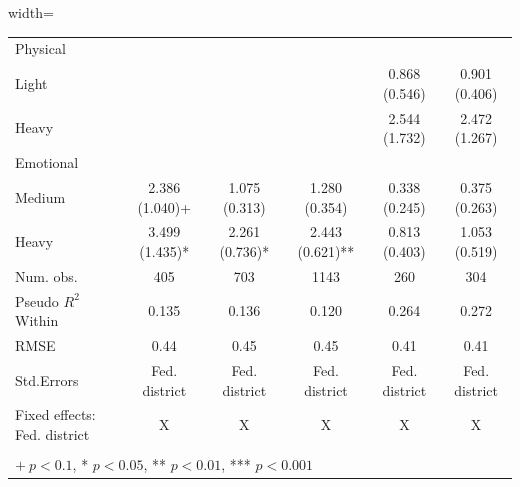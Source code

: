 \begin{adjustbox}{width=\textwidth}
\begin{tabular}{lccccc}
		Physical & & & & & \\
		\hspace{3mm}Light &  &  &  & \num{0.868} (\num{0.546}) & \num{0.901} (\num{0.406})\\
		\hspace{3mm}Heavy &  &  &  & \num{2.544} (\num{1.732}) & \num{2.472} (\num{1.267})\\
		Emotional & & & & & \\
		\hspace{3mm}Medium & \num{2.386} (\num{1.040})+ & \num{1.075} (\num{0.313}) & \num{1.280} (\num{0.354}) & \num{0.338} (\num{0.245}) & \num{0.375} (\num{0.263})\\
		\hspace{3mm}Heavy & \num{3.499} (\num{1.435})* & \num{2.261} (\num{0.736})* & \num{2.443} (\num{0.621})** & \num{0.813} (\num{0.403}) & \num{1.053} (\num{0.519})\\
		\midrule
		Num. obs. & \num{405} & \num{703} & \num{1143} & \num{260} & \num{304}\\
		Pseudo $R^{2}$ Within & \num{0.135} & \num{0.136}  & \num{0.120} & \num{0.264} & \num{0.272}\\
		RMSE & \num{0.44} & \num{0.45} & \num{0.45} & \num{0.41} & \num{0.41}\\
		Std.Errors & Fed. district & Fed. district & Fed. district & Fed. district & Fed. district\\
		Fixed effects: Fed. district & X & X & X & X & X\\
		\bottomrule
		\vspace{-3mm}\\
		\multicolumn{6}{l}{$+\ p < 0.1$, * $p < 0.05$, ** $p < 0.01$, *** $p < 0.001$}
	\end{tabular}
\end{adjustbox}